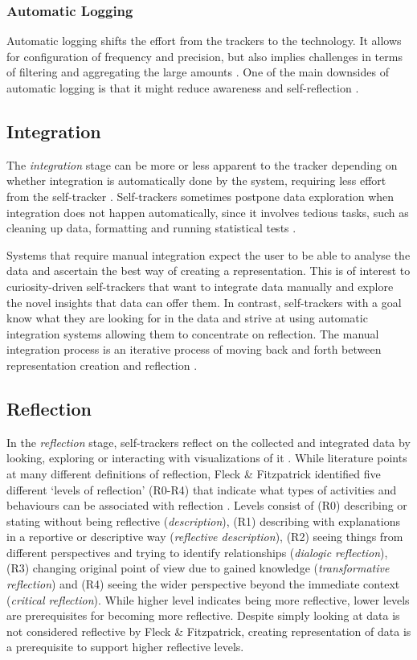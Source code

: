 \subsubsection{Automatic Logging}
Automatic logging shifts the effort from the trackers to the technology. It allows for configuration of frequency and precision, but also implies challenges in terms of filtering and aggregating the large amounts \cite{Muller}. One of the main downsides of automatic logging is that it might reduce awareness and self-reflection \cite{Choe2014, Li2011}.

\subsection{Integration}
The \textit{integration} stage can be more or less apparent to the tracker depending on whether integration is automatically done by the system, requiring less effort from the self-tracker \cite{Li2010}. Self-trackers sometimes postpone data exploration when integration does not happen automatically, since it involves tedious tasks, such as cleaning up data, formatting and running statistical tests \cite{Choe2014, Chung2015, Li2010}. 

Systems that require manual integration expect the user to be able to analyse the data and ascertain the best way of creating a representation. This is of interest to curiosity-driven self-trackers that want to integrate data manually and explore the novel insights that data can offer them. In contrast, self-trackers with a goal know what they are looking for in the data and strive at using automatic integration systems allowing them to concentrate on reflection. The manual integration process is an iterative process of moving back and forth between representation creation and reflection \cite{Whooley2014}. 

\subsection{Reflection}
In the \textit{reflection} stage, self-trackers reflect on the collected and integrated data by looking, exploring or interacting with visualizations of it \cite{Li2010}. While literature points at many different definitions of reflection, Fleck \& Fitzpatrick identified five different ‘levels of reflection’ (R0-R4) that indicate what types of activities and behaviours can be associated with reflection \cite{Fleck}. Levels consist of (R0) describing or stating without being reflective (\textit{description}), (R1) describing with explanations in a reportive or descriptive way (\textit{reflective description}), (R2) seeing things from different perspectives and trying to identify relationships (\textit{dialogic reflection}), (R3) changing original point of view due to gained knowledge (\textit{transformative reflection}) and (R4) seeing the wider perspective beyond the immediate context (\textit{critical reflection}). While higher level indicates being more reflective, lower levels are prerequisites for becoming more reflective. Despite simply looking at data is not considered reflective by Fleck \& Fitzpatrick, creating representation of data is a prerequisite to support higher reflective levels. 

